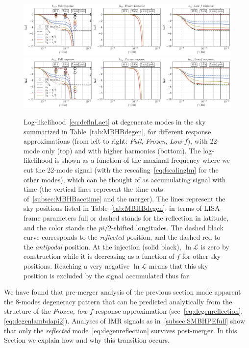 \documentclass[aps,showpacs,twocolumn,prd,superscriptaddress,nofootinbib]{revtex4-1}
\newcommand\calL{{\mathcal{L}}}
\begin{document}
\begin{figure}
  \centering
  \includegraphics[width=.99\linewidth]{../plots/lnL_skymodes_approx_22.pdf}
  \includegraphics[width=.99\linewidth]{../plots/lnL_skymodes_approx_hm.pdf}
  \caption{Log-likelihood~\eqref{eq:deflnLaet} at degenerate modes in the sky summarized in Table~\ref{tab:MBHBdegen}, for different response approximations (from left to right: \textit{Full}, \textit{Frozen}, \textit{Low-$f$}), with 22-mode only (top) and with higher harmonics (bottom). The log-likelihood is shown as a function of the maximal frequency where we cut the 22-mode signal (with the rescaling~\eqref{eq:fscalinglm} for the other modes), which can be thought of as accumulating signal with time (the vertical lines represent the time cuts of~\ref{subsec:MBHBacctime} and the merger). The lines represent the sky positions listed in Table~\ref{tab:MBHBdegen}: in terms of LISA-frame parameters full or dashed stands for the reflection in latitude, and the color stands the $pi/2$-shifted longitudes. The dashed black curve corresponds to the \textit{reflected} position, and the dashed red to the \textit{antipodal} position. At the injection (solid black), $\ln\calL$ is zero by construction while it is decreasing as a function of $f$ for other sky positions. Reaching a very negative $\ln\calL$ means that this sky position is excluded by the signal accumulated thus far.}
  \label{fig:lnLskymodesapprox}
\end{figure}

We have found that pre-merger analysis of the previous section made apparent the 8-modes degeneracy pattern that can be predicted analytically from the structure of the \textit{Frozen, low-$f$} response approximation (see~\eqref{eq:degenreflection}, \eqref{eq:degenlambdapi2}). Analyses of IMR signals as in~\ref{subsec:SMBHPEfull} show that only the \textit{reflected} mode~\eqref{eq:degenreflection} survives post-merger. In this Section we explain how and why this transition occurs.
\end{document}
